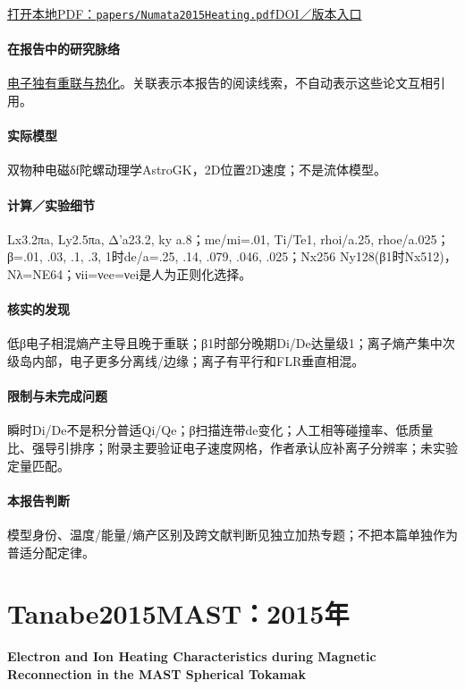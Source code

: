 \documentclass[UTF8,a4paper,11pt,openany,fontset=fandol]{ctexbook}
\begin{document}
\href{run:../papers/Numata2015Heating.pdf}{打开本地PDF：\texttt{papers/Numata2015Heating.pdf}}\quad\href{https://doi.org/10.1017/S002237781400107X}{DOI／版本入口}

\paragraph{在报告中的研究脉络}\hyperref[story:energy]{电子独有重联与热化}。关联表示本报告的阅读线索，不自动表示这些论文互相引用。

\paragraph{实际模型}双物种电磁δf陀螺动理学AstroGK，2D位置2D速度；不是流体模型。

\paragraph{计算／实验细节}Lx3.2πa, Ly2.5πa, Δ'a23.2, ky a.8；me/mi=.01, Ti/Te1, rhoi/a.25, rhoe/a.025；β=.01, .03, .1, .3, 1时de/a=.25, .14, .079, .046, .025；Nx256 Ny128(β1时Nx512)，Nλ=NE64；νii=νee=νei是人为正则化选择。

\paragraph{核实的发现}低β电子相混熵产主导且晚于重联；β1时部分晚期Di/De达量级1；离子熵产集中次级岛内部，电子更多分离线/边缘；离子有平行和FLR垂直相混。

\paragraph{限制与未完成问题}瞬时Di/De不是积分普适Qi/Qe；β扫描连带de变化；人工相等碰撞率、低质量比、强导引排序；附录主要验证电子速度网格，作者承认应补离子分辨率；未实验定量匹配。

\paragraph{本报告判断}模型身份、温度/能量/熵产区别及跨文献判断见独立加热专题；不把本篇单独作为普适分配定律。

\section{Tanabe2015MAST：2015年}\label{paper:Tanabe2015MAST}

\textbf{Electron and Ion Heating Characteristics during Magnetic Reconnection in the MAST Spherical Tokamak}\citep{Tanabe2015MAST}\
\end{document}
